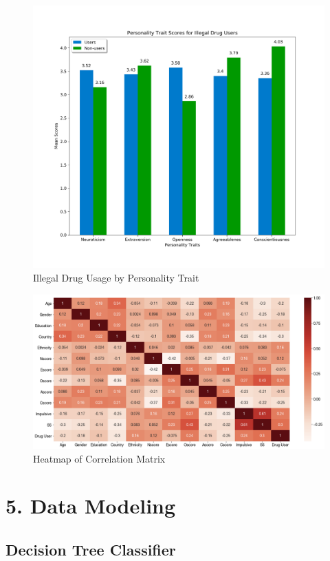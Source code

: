 \documentclass[10pt]{article}
\begin{document}
\begin{figure}[H]
\caption{Illegal Drug Usage by Personality Trait}
\label{fig:traits}
\centering
\includegraphics[scale=0.25]{traits.png}
\end{figure}

\begin{figure}[H]
\caption{Heatmap of Correlation Matrix}
\label{fig:heatmap}
\centering
\includegraphics[scale=0.25]{heatmap.png}
\end{figure}

\section*{5. Data Modeling}

\subsection*{Decision Tree Classifier}
\end{document}
